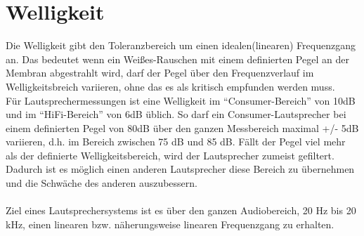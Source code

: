 \section{Welligkeit} \label{sec:3.7}
Die Welligkeit gibt den Toleranzbereich um einen idealen(linearen) Frequenzgang an.
Das bedeutet wenn ein Weißes-Rauschen mit einem definierten Pegel an der Membran abgestrahlt wird, darf der Pegel über den Frequenzverlauf im Welligkeitsbreich variieren, ohne das es als kritisch empfunden werden muss. \\
Für Lautsprechermessungen ist eine Welligkeit im \enquote{Consumer-Bereich} von 10dB und im \enquote{HiFi-Bereich} von 6dB üblich.
So darf ein Consumer-Lautsprecher bei einem definierten Pegel von 80dB über den ganzen Messbereich maximal +/- 5dB variieren, d.h. im Bereich zwischen 75 dB und 85 dB.
Fällt der Pegel viel mehr als der definierte Welligkeitsbereich, wird der Lautsprecher zumeist gefiltert.
Dadurch ist es möglich einen anderen Lautsprecher diese Bereich zu übernehmen und die Schwäche des anderen auszubessern.\\ \\
Ziel eines Lautsprechersystems ist es über den ganzen Audiobereich, 20 Hz bis 20 kHz, einen linearen bzw. näherungsweise linearen Frequenzgang zu erhalten.




